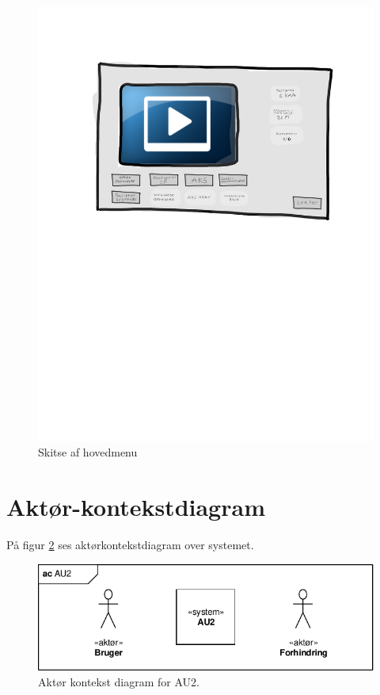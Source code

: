 \begin{figure}[h]
\centering
\includegraphics[width=\textwidth*2/3]{../fig/gui/hovedmenu}
\caption{Skitse af hovedmenu}
\label{fig:main_menu}
\end{figure}

\clearpage 

\section{Aktør-kontekstdiagram} \label{sec:aktor-kontekstdiagram}
På figur \ref{fig:aktor_kontekst} ses aktørkontekstdiagram over systemet. 

\begin{figure}[h]
\centering
\includegraphics[scale=1.1]{../fig/diagrammer/ac_au2.pdf}
\caption{Aktør kontekst diagram for AU2.}
\label{fig:aktor_kontekst}
\end{figure}

